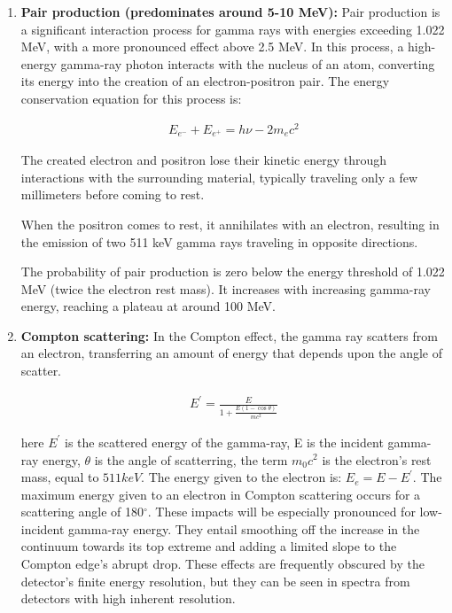 \begin{enumerate}
        \item \textbf{Pair production (predominates around 5-10 MeV):} Pair production is a significant interaction process for gamma rays with energies exceeding 1.022 MeV, with a more pronounced effect above 2.5 MeV. In this process, a high-energy gamma-ray photon interacts with the nucleus of an atom, converting its energy into the creation of an electron-positron pair. The energy conservation equation for this process is:

        \begin{align}E_{e^-} + E_{e^+} = h\nu - 2m_ec^2 \end{align}

        The created electron and positron lose their kinetic energy through interactions with the surrounding material, typically traveling only a few millimeters before coming to rest.

        When the positron comes to rest, it annihilates with an electron, resulting in the emission of two 511 keV gamma rays traveling in opposite directions.

        The probability of pair production is zero below the energy threshold of 1.022 MeV (twice the electron rest mass). It increases with increasing gamma-ray energy, reaching a plateau at around 100 MeV.\\
    
        \item \textbf{Compton scattering:} In the Compton effect, the gamma ray scatters from an electron, transferring an amount of energy that depends upon the angle of scatter.

        \begin{align}E^{'} = \frac{E}{1+\frac{E(1-\cos\theta)}{mc^2}}\end{align}

        here $E^{'}$ is the scattered energy of the gamma-ray,	E is the incident gamma-ray energy, $\theta$ is the angle of scatterring, the term $m_0c^2$ is the electron's rest mass, equal to $511 keV$. The energy given to the electron is: $E_e=E-E^{'}$. The maximum energy given to an electron in Compton scattering occurs for a scattering angle of 180$^{\circ}$. These impacts will be especially pronounced for low-incident gamma-ray energy. They entail smoothing off the increase in the continuum towards its top extreme and adding a limited slope to the Compton edge's abrupt drop. These effects are frequently obscured by the detector's finite energy resolution, but they can be seen in spectra from detectors with high inherent resolution.
    
    \end{enumerate}
